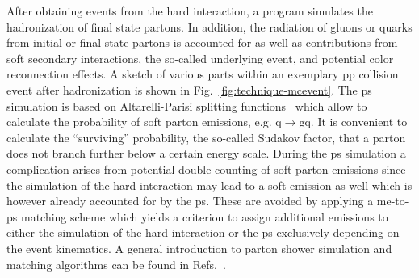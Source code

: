 After obtaining events from the hard interaction, a  program simulates the hadronization of final state partons. In addition, the radiation of gluons or quarks from initial or final state partons is accounted for as well as contributions from soft secondary interactions, the so-called underlying event, and potential color reconnection effects. A sketch of various parts within an exemplary pp collision event after hadronization is shown in Fig.~\ref{fig:technique-mcevent}. The \gls{ps} simulation is based on Altarelli-Parisi splitting functions~\cite{Altarelli:1977zs} which allow to calculate the probability of soft parton emissions, e.g. $\mathrm{q}\to \mathrm{gq}$. It is convenient to calculate the ``surviving'' probability, the so-called Sudakov factor, that a parton does not branch further below a certain energy scale. During the \gls{ps} simulation a complication arises from potential double counting of soft parton emissions since the simulation of the hard interaction may lead to a soft emission as well which is however already accounted for by the \gls{ps}. These are avoided by applying a \gls{me}-to-\gls{ps} matching scheme which yields a criterion to assign additional emissions to either the simulation of the hard interaction or the \gls{ps} exclusively depending on the event kinematics. A general introduction to parton shower simulation and matching algorithms can be found in Refs.~\cite{Hoche:2014rga,Alwall:2007fs}.




